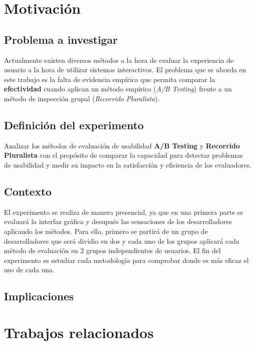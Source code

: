 \documentclass[a4paper,12pt]{report}
\begin{document}
\chapter{Motivación}

\section{Problema a investigar}
Actualmente existen diversos métodos a la hora de evaluar la experiencia de usuario a la hora de utilizar sistemas interactivos. El problema que se aborda en este trabajo es la falta de evidencia empírica que permita comparar la \textbf{efectividad} cuando aplican un método empírico (\textit{A/B Testing}) frente a un método de inspección grupal (\textit{Recorrido Pluralista}).

\section{Definición del experimento}
Analizar los métodos de evaluación de usabilidad \textbf{A/B Testing} y \textbf{Recorrido Pluralista} con el propósito de comparar la capacidad para detectar problemas de usabilidad y medir su impacto en la satisfacción y eficiencia de los evaluadores.


\section{Contexto}
El experimento se realiza de manera presencial, ya que en una primera parte se evaluará la interfaz gráfica y desupués las sensaciones de los desarrolladores aplicando los métodos. Para ello, primero se partirá de un grupo de desarrolladores que será dividio en dos y cada uno de los grupos aplicará cada método de evaluación en 2 grupos independientes de usuarios. El fin del experimento es estudiar cada metodología para comprobar donde es más eficaz el uso de cada una.

\section{Implicaciones}

\chapter{Trabajos relacionados}
\end{document}

